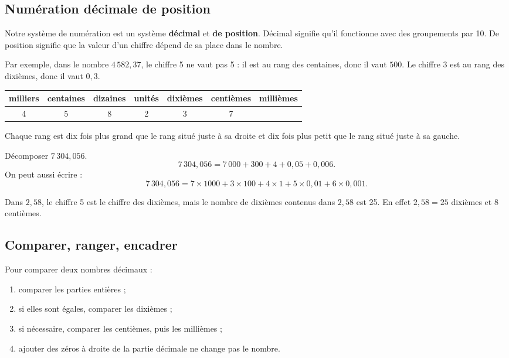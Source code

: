 \documentclass[11pt,a4paper]{article}
\begin{document}
\subsection{Numération décimale de position}

\begin{definitionbox}
Notre système de numération est un système \textbf{décimal} et \textbf{de position}. Décimal signifie qu'il fonctionne avec des groupements par 10. De position signifie que la valeur d'un chiffre dépend de sa place dans le nombre.
\end{definitionbox}

Par exemple, dans le nombre \(4\,582,37\), le chiffre 5 ne vaut pas 5 : il est au rang des centaines, donc il vaut \(500\). Le chiffre 3 est au rang des dixièmes, donc il vaut \(0,3\).

\begin{center}
\begin{tabular}{|c|c|c|c|c|c|c|}
\hline
milliers & centaines & dizaines & unités & dixièmes & centièmes & millièmes \\\hline
4 & 5 & 8 & 2 & 3 & 7 & \\\hline
\end{tabular}
\end{center}

\begin{retenirbox}
Chaque rang est dix fois plus grand que le rang situé juste à sa droite et dix fois plus petit que le rang situé juste à sa gauche.
\end{retenirbox}

\begin{exemplebox}
Décomposer \(7\,304,056\).
\[
7\,304,056=7\,000+300+4+0,05+0,006.
\]
On peut aussi écrire :
\[
7\,304,056=7\times1000+3\times100+4\times1+5\times0,01+6\times0,001.
\]
\end{exemplebox}

\begin{erreurbox}
Dans \(2,58\), le chiffre 5 est le chiffre des dixièmes, mais le nombre de dixièmes contenus dans \(2,58\) est 25. En effet \(2,58=25\) dixièmes et 8 centièmes.
\end{erreurbox}

\subsection{Comparer, ranger, encadrer}

\begin{methodbox}
Pour comparer deux nombres décimaux :
\begin{enumerate}[label=\arabic*)]
\item comparer les parties entières ;
\item si elles sont égales, comparer les dixièmes ;
\item si nécessaire, comparer les centièmes, puis les millièmes ;
\item ajouter des zéros à droite de la partie décimale ne change pas le nombre.
\end{enumerate}
\end{methodbox}
\end{document}
